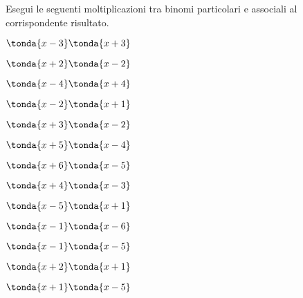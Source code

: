 \begin{esercizio}
\label{ese:11.}
Esegui le seguenti moltiplicazioni tra binomi particolari e associali al 
corrispondente risultato.
\begin{htmulticols}{3}
\begin{enumeratea}
\spazielenx
\item \(\tonda{x - 3}\tonda{x + 3}\) %
\item \(\tonda{x + 2}\tonda{x - 2}\) %
\item \(\tonda{x - 4}\tonda{x + 4}\) %
\item \(\tonda{x - 2}\tonda{x + 1}\) %
\item \(\tonda{x + 3}\tonda{x - 2}\) %
\item \(\tonda{x + 5}\tonda{x - 4}\) %
\item \(\tonda{x + 6}\tonda{x - 5}\) %
\item \(\tonda{x + 4}\tonda{x - 3}\) %
\item \(\tonda{x - 5}\tonda{x + 1}\) %
\item \(\tonda{x - 1}\tonda{x - 6}\) %
\item \(\tonda{x - 1}\tonda{x - 5}\) %
\item \(\tonda{x + 2}\tonda{x + 1}\) %
\item \(\tonda{x + 1}\tonda{x - 5}\) %

\end{enumeratea}
\end{htmulticols}
\end{esercizio}

